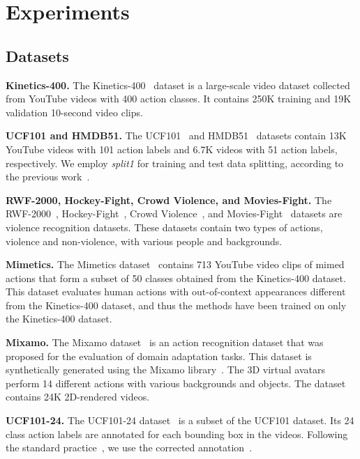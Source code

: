 \documentclass[10pt,twocolumn,letterpaper]{article}
\begin{document}
\section{Experiments}

\subsection{Datasets}

\noindent \textbf{Kinetics-400.} 
The Kinetics-400~\cite{Carreira2017CVPR} dataset is a large-scale video dataset collected from YouTube videos with 400 action classes.
It contains 250K training and 19K validation 10-second video clips.

\noindent \textbf{UCF101 and HMDB51.} 
The UCF101~\cite{Soomro2012Arxiv} and HMDB51~\cite{Kuehne2011ICCV} datasets contain 13K YouTube videos with 101 action labels and 6.7K videos with 51 action labels, respectively.
We employ \textit{split1} for training and test data splitting, according to the previous work~\cite{Duan2022CVPR}.


\noindent \textbf{RWF-2000, Hockey-Fight, Crowd Violence, and Movies-Fight.} 
The RWF-2000~\cite{Cheng2021ICPR}, Hockey-Fight~\cite{CAIP2011Nievas}, Crowd Violence~\cite{CVPR2012Hassner}, and Movies-Fight~\cite{nievas2011violence} datasets are violence recognition datasets.
These datasets contain two types of actions, violence and non-violence, with various people and backgrounds.


\noindent \textbf{Mimetics.} 
The Mimetics dataset~\cite{Weinzaepfel2021IJCV} contains 713 YouTube video clips of mimed actions that form a subset of 50 classes obtained from the Kinetics-400 dataset.
This dataset evaluates human actions with out-of-context appearances different from the Kinetics-400 dataset, and thus the methods have been trained on only the Kinetics-400 dataset.

\noindent \textbf{Mixamo.} 
The Mixamo dataset~\cite{Costa2022WACV} is an action recognition dataset that was proposed for the evaluation of domain adaptation tasks.
This dataset is synthetically generated using the Mixamo library~\cite{mixamo}.
The 3D virtual avatars perform 14 different actions with various backgrounds and objects.
The dataset contains 24K 2D-rendered videos.

\noindent \textbf{UCF101-24.} 
The UCF101-24 dataset~\cite{Soomro2012Arxiv} is a subset of the UCF101 dataset.
Its 24 class action labels are annotated for each bounding box in the videos.
Following the standard practice~\cite{Cheron2018Neurips,Anurag2020ECCV}, we use the corrected annotation~\cite{Singh2017ICCV}.
\end{document}

